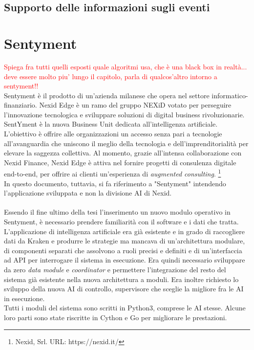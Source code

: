 \documentclass[a4paper,12pt]{report}
\begin{document}
\subsection{Supporto delle informazioni sugli eventi}


\section{Sentyment}
\textcolor{red}{Spiega fra tutti quelli esposti quale algoritmi usa, che è una black box in realtà... deve essere molto piu' lungo il capitolo, parla di qualcos'altro intorno a sentyment!!\\}
Sentyment è il prodotto di un'azienda milanese che opera nel settore informatico-finanziario. Nexid Edge è un ramo del gruppo NEXiD votato per perseguire l'innovazione tecnologica e sviluppare soluzioni di digital business rivoluzionarie. SentYment è la nuova Business Unit dedicata all'intelligenza artificiale.\\
L'obiettivo è offrire alle organizzazioni un accesso senza pari a tecnologie all'avanguardia che uniscono il meglio della tecnologia e dell'imprenditorialità per elevare la saggezza collettiva. Al momento, grazie all'intensa collaborazione con Nexid Finance, Nexid Edge è attiva nel fornire progetti di consulenza digitale end-to-end, per offrire ai clienti un'esperienza di \textit{augmented consulting}. \footnote{Nexid, Srl. URL: https://nexid.it/}\\
In questo documento, tuttavia, si fa riferimento a "Sentyment" intendendo l'applicazione sviluppata e non la divisione AI di Nexid.
\\~\\

Essendo il fine ultimo della tesi l'inserimento un nuovo modulo operativo in Sentyment, è necessario prendere familiarità con il software e i dati che tratta.\\
L'applicazione di intelligenza artificiale era già esistente e in grado di raccogliere dati da Kraken e produrre le strategie ma mancava di un'architettura modulare, di componenti separati che assolvono a ruoli precisi e definiti e di un'interfaccia ad API per interrogare il sistema in esecuzione. Era quindi necessario sviluppare da zero \textit{data module} e \textit{coordinator} e permettere l'integrazione del resto del sistema già esistente nella nuova architettura a moduli. Era inoltre richiesto lo sviluppo della nuova AI di controllo, supervisore che sceglie la migliore fra le AI in esecuzione.\\
Tutti i moduli del sistema sono scritti in Python3, comprese le AI stesse. Alcune loro parti sono state riscritte in Cython e Go per migliorare le prestazioni.
\end{document}
